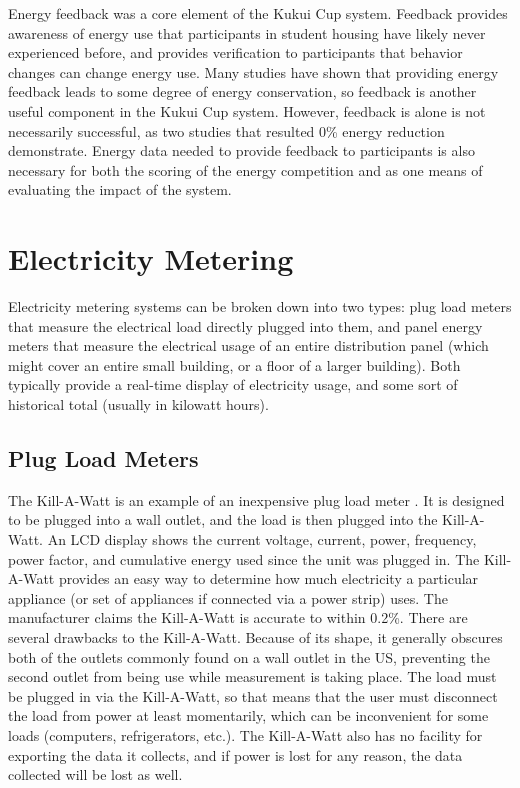 Energy feedback was a core element of the Kukui Cup system. Feedback provides awareness of energy use that participants in student housing have likely never experienced before, and provides verification to participants that behavior changes can change energy use. Many studies have shown that providing energy feedback leads to some degree of energy conservation, so feedback is another useful component in the Kukui Cup system. However, feedback is alone is not necessarily successful, as two studies that resulted 0\% energy reduction demonstrate. Energy data needed to provide feedback to participants is also necessary for both the scoring of the energy competition and as one means of evaluating the impact of the system.


\section{Electricity Metering}

Electricity metering systems can be broken down into two types: plug load meters that measure the electrical load directly plugged into them, and panel energy meters that measure the electrical usage of an entire distribution panel (which might cover an entire small building, or a floor of a larger building). Both typically provide a real-time display of electricity usage, and some sort of historical total (usually in kilowatt hours).

\subsection{Plug Load Meters}
\label{sec:plug-load-meters}

The Kill-A-Watt is an example of an inexpensive plug load meter \cite{kill-a-watt}. It is designed to be plugged into a wall outlet, and the load is then plugged into the Kill-A-Watt. An LCD display shows the current voltage, current, power, frequency, power factor, and cumulative energy used since the unit was plugged in. The Kill-A-Watt provides an easy way to determine how much electricity a particular appliance (or set of appliances if connected via a power strip) uses. The manufacturer claims the Kill-A-Watt is accurate to within 0.2\%. There are several drawbacks to the Kill-A-Watt. Because of its shape, it generally obscures both of the outlets commonly found on a wall outlet in the US, preventing the second outlet from being use while measurement is taking place. The load must be plugged in via the Kill-A-Watt, so that means that the user must disconnect the load from power at least momentarily, which can be inconvenient for some loads (computers, refrigerators, etc.). The Kill-A-Watt also has no facility for exporting the data it collects, and if power is lost for any reason, the data collected will be lost as well.

